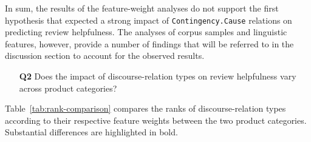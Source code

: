 \documentclass[
    a4paper,%
    12pt,%
    oneside,%
    toc=bibliography,
    final,
]{scrartcl}
\begin{document}
In sum, the results of the feature-weight analyses do not support the first hypothesis that expected a strong impact of \lstinline|Contingency.Cause| relations on predicting review helpfulness. The analyses of corpus samples and linguistic features, however, provide a number of findings that will be referred to in the discussion section to account for the observed results.


\begin{enumerate}[rightmargin=1cm]
\item[\textbf{Q2}] Does the impact of discourse-relation types on review helpfulness vary across product categories?
\end{enumerate}

Table~\ref{tab:rank-comparison} compares the ranks of discourse-relation types according to their respective feature weights between the two product categories. Substantial differences are highlighted in bold.
\end{document}
